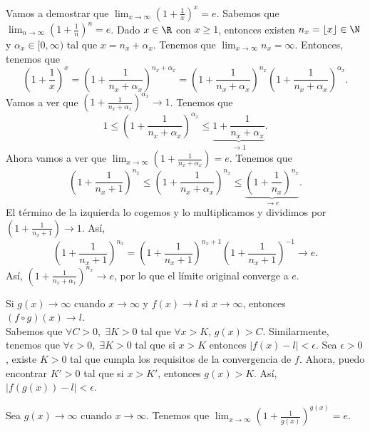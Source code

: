 \begin{eg}
\normalfont Vamos a demostrar que $\displaystyle \lim_{x \to \infty}\left(1 + \frac{1}{x}\right)^{x}=e $. Sabemos que $\displaystyle \lim_{n \to \infty}\left(1 + \frac{1}{n}\right)^{n} =e $. Dado $\displaystyle x \in \R $ con $\displaystyle x \geq 1 $, entonces existen $\displaystyle n_{x} = \left\lfloor x \right\rfloor \in \N $ y $\displaystyle \alpha_{x}\in[0,\infty) $ tal que $\displaystyle x = n_{x} +\alpha_{x} $. Tenemos que $\displaystyle \lim_{x \to \infty}n_{x} = \infty $. Entonces, tenemos que
\[\left(1 + \frac{1}{x}\right)^{x} = \left(1 + \frac{1}{n_{x}+\alpha_{x}}\right)^{n_{x}+\alpha_{x}}= \left(1 + \frac{1}{n_{x}+\alpha_{x}}\right)^{n_{x}} \left(1 + \frac{1}{n_{x}+\alpha_{x}}\right)^{\alpha_{x}}.\]
Vamos a ver que $\displaystyle \left(1 + \frac{1}{n_{x}+\alpha_{x}}\right)^{\alpha_{x}} \to 1 $. Tenemos que
\[1 \leq \left(1 + \frac{1}{n_{x}+\alpha_{x}}\right)^{\alpha_{x}}\leq \underbrace{ 1 + \frac{1}{n_{x}+\alpha_{x}}}_{\to1} .\]
Ahora vamos a ver que $\displaystyle \lim_{x \to \infty}\left(1+\frac{1}{n_{x}+\alpha_{x}}\right)=e $. Tenemos que 
\[\left(1+\frac{1}{n_{x}+1}\right)^{n_{x}}\leq\left(1 + \frac{1}{n_{x}+\alpha_{x}}\right)^{n_{x}} \leq \underbrace{\left(1 + \frac{1}{n_{x}}\right)^{n_{x}}}_{\to e} .\]
El término de la izquierda lo cogemos y lo multiplicamos y dividimos por $\displaystyle \left(1+\frac{1}{n_{x}+1}\right) \to 1 $. Así,
\[\left(1+\frac{1}{n_{x}+1}\right)^{n_{x}} = \left(1 + \frac{1}{n_{x}+1}\right)^{n_{x}+1}\left(1+\frac{1}{n_{x}+1}\right)^{-1} \to e .\]
Así, $\displaystyle \left(1+\frac{1}{n_{x}+\alpha_{x}}\right)^{n_{x}} \to e $, por lo que el límite original converge a $\displaystyle e $.
\end{eg}

\begin{eg}
\normalfont Si $\displaystyle g\left(x\right) \to \infty $ cuando $\displaystyle x \to \infty $ y $\displaystyle f\left(x\right) \to l $ si $\displaystyle x \to \infty $, entonces $\displaystyle \left(f \circ g\right)\left(x\right) \to l $. \\
Sabemos que $\displaystyle \forall C > 0, \; \exists K > 0 $ tal que $\displaystyle \forall x > K $, $\displaystyle g\left(x\right) > C $. Similarmente, tenemos que $\displaystyle \forall \epsilon > 0, \; \exists K > 0 $ tal que si $\displaystyle x > K $ entonces $\displaystyle \left|f\left(x\right)-l\right|<\epsilon  $. Sea $\displaystyle \epsilon > 0 $, existe $\displaystyle K > 0 $ tal que cumpla los requisitos de la convergencia de $\displaystyle f $. Ahora, puedo encontrar $\displaystyle K' > 0 $ tal que si $\displaystyle x > K' $, entonces $\displaystyle g\left(x\right) > K $. Así, $\displaystyle \left|f\left(g\left(x\right)\right)-l\right|<\epsilon  $.
\end{eg}
\begin{fcolorary}[]
\normalfont Sea $\displaystyle g\left(x\right) \to \infty $ cuando $\displaystyle x \to \infty $. Tenemos que $\displaystyle \lim_{x \to \infty}\left(1+\frac{1}{g\left(x\right)}\right)^{g\left(x\right)}=e. $ 
\end{fcolorary}

